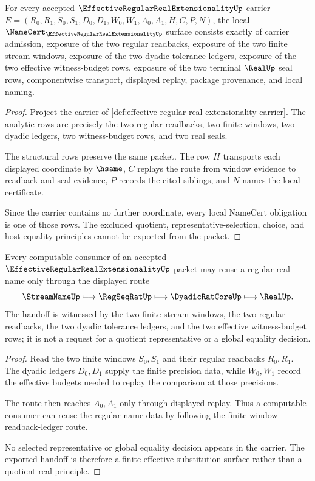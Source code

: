 \begin{theorem}
\label{thm:effective-regular-real-extensionality-namecert-obligations}
For every accepted $\EffectiveRegularRealExtensionalityUp$ carrier $E=(R_0,R_1,S_0,S_1,D_0,D_1,W_0,W_1,A_0,A_1,H,C,P,N)$, the local $\NameCert_{\EffectiveRegularRealExtensionalityUp}$ surface consists exactly of carrier admission, exposure of the two regular readbacks, exposure of the two finite stream windows, exposure of the two dyadic tolerance ledgers, exposure of the two effective witness-budget rows, exposure of the two terminal $\RealUp$ seal rows, componentwise transport, displayed replay, package provenance, and local naming.
\end{theorem}
\begin{proof}
Project the carrier of \autoref{def:effective-regular-real-extensionality-carrier}. The analytic rows are precisely the two regular readbacks, two finite windows, two dyadic ledgers, two witness-budget rows, and two real seals.

The structural rows preserve the same packet. The row $H$ transports each displayed coordinate by $\hsame$, $C$ replays the route from window evidence to readback and seal evidence, $P$ records the cited siblings, and $N$ names the local certificate.

Since the carrier contains no further coordinate, every local NameCert obligation is one of those rows. The excluded quotient, representative-selection, choice, and host-equality principles cannot be exported from the packet.
\end{proof}

\begin{theorem}
\label{thm:effective-regular-real-extensionality-computable-handoff}
Every computable consumer of an accepted $\EffectiveRegularRealExtensionalityUp$ packet may reuse a regular real name only through the displayed route
$$
\StreamNameUp \longmapsto \RegSeqRatUp \longmapsto \DyadicRatCoreUp \longmapsto \RealUp .
$$
The handoff is witnessed by the two finite stream windows, the two regular readbacks, the two dyadic tolerance ledgers, and the two effective witness-budget rows; it is not a request for a quotient representative or a global equality decision.
\end{theorem}
\begin{proof}
Read the two finite windows $S_0,S_1$ and their regular readbacks $R_0,R_1$. The dyadic ledgers $D_0,D_1$ supply the finite precision data, while $W_0,W_1$ record the effective budgets needed to replay the comparison at those precisions.

The route then reaches $A_0,A_1$ only through displayed replay. Thus a computable consumer can reuse the regular-name data by following the finite window-readback-ledger route.

No selected representative or global equality decision appears in the carrier. The exported handoff is therefore a finite effective substitution surface rather than a quotient-real principle.
\end{proof}


